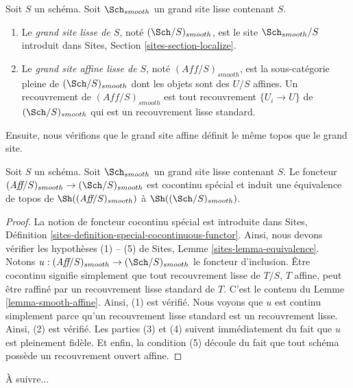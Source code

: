 \begin{definition}
\label{definition-big-small-smooth}
Soit $S$ un schéma. Soit $\Sch_{smooth}$ un grand site lisse contenant $S$.
\begin{enumerate}
\item Le {\it grand site lisse de $S$}, noté $(\Sch/S)_{smooth}$, est le site $\Sch_{smooth}/S$ introduit dans Sites, Section \ref{sites-section-localize}.
\item Le {\it grand site affine lisse de $S$}, noté $(\textit{Aff}/S)_{smooth}$, est la sous-catégorie pleine de $(\Sch/S)_{smooth}$ dont les objets sont des $U/S$ affines. Un recouvrement de $(\textit{Aff}/S)_{smooth}$ est tout recouvrement $\{U_i \to U\}$ de $(\Sch/S)_{smooth}$ qui est un recouvrement lisse standard.
\end{enumerate}
\end{definition}

\noindent
Ensuite, nous vérifions que le grand site affine définit le même topos que le grand site.

\begin{lemma}
\label{lemma-affine-big-site-smooth}
Soit $S$ un schéma. Soit $\Sch_{smooth}$ un grand site lisse contenant $S$. Le foncteur $(\textit{Aff}/S)_{smooth} \to (\Sch/S)_{smooth}$ est cocontinu spécial et induit une équivalence de topos de $\Sh((\textit{Aff}/S)_{smooth})$ à $\Sh((\Sch/S)_{smooth})$.
\end{lemma}

\begin{proof}
La notion de foncteur cocontinu spécial est introduite dans Sites, Définition \ref{sites-definition-special-cocontinuous-functor}. Ainsi, nous devons vérifier les hypothèses (1) -- (5) de Sites, Lemme \ref{sites-lemma-equivalence}. Notons $u : (\textit{Aff}/S)_{smooth} \to (\Sch/S)_{smooth}$ le foncteur d'inclusion. Être cocontinu signifie simplement que tout recouvrement lisse de $T/S$, $T$ affine, peut être raffiné par un recouvrement lisse standard de $T$. C'est le contenu du Lemme \ref{lemma-smooth-affine}. Ainsi, (1) est vérifié. Nous voyons que $u$ est continu simplement parce qu'un recouvrement lisse standard est un recouvrement lisse. Ainsi, (2) est vérifié. Les parties (3) et (4) suivent immédiatement du fait que $u$ est pleinement fidèle. Et enfin, la condition (5) découle du fait que tout schéma possède un recouvrement ouvert affine.
\end{proof}

\noindent
À suivre...

